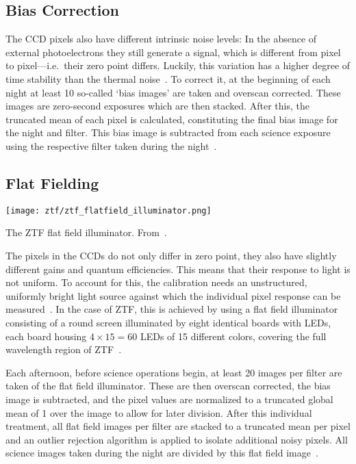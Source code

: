 \subsection{Bias Correction}
The CCD pixels also have different intrinsic noise levels: In the absence of external photoelectrons they still generate a signal, which is different from pixel to pixel---i.e.\ their zero point differs. Luckily, this variation has a higher degree of time stability than the thermal noise~. To correct it, at the beginning of each night at least 10 so-called `bias images' are taken and overscan corrected. These images are zero-second exposures which are then stacked. After this, the truncated mean of each pixel is calculated, constituting the final bias image for the night and filter. This bias image is subtracted from each science exposure using the respective filter taken during the night~\cite{Masci2019a}.

\subsection{Flat Fielding}

\begin{marginfigure}
    \texttt{[image: ztf/ztf\_flatfield\_illuminator.png]}
    \caption[ZTF flat field illuminator]{The ZTF flat field illuminator. From~\cite{Dekany2020}.}
\end{marginfigure}

The pixels in the CCDs do not only differ in zero point, they also have slightly different gains and quantum efficiencies. This means that their response to light is not uniform. To account for this, the calibration needs an unstructured, uniformly bright light source against which the individual pixel response can be measured~\cite{Howell2006}. In the case of ZTF, this is achieved by using a flat field illuminator consisting of a round screen illuminated by eight identical boards with LEDs, each board housing $4\times15=60$ LEDs of 15 different colors, covering the full wavelength region of ZTF~\cite{Dekany2020}.

Each afternoon, before science operations begin, at least 20 images per filter are taken of the flat field illuminator. These are then overscan corrected, the bias image is subtracted, and the pixel values are normalized to a truncated global mean of 1 over the image to allow for later division. After this individual treatment, all flat field images per filter are stacked to a truncated mean per pixel and an outlier rejection algorithm is applied to isolate additional noisy pixels. All science images taken during the night are divided by this flat field image~\cite{Masci2019a}.

